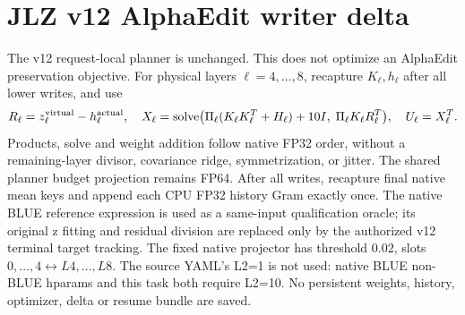 \section*{JLZ v12 AlphaEdit writer delta}
The v12 request-local planner is unchanged. This does not optimize an AlphaEdit preservation objective.
For physical layers $\ell=4,\ldots,8$, recapture $K_\ell,h_\ell$ after all lower writes, and use
\[
R_\ell=z^{\rm virtual}_\ell-h^{\rm actual}_\ell,\quad
X_\ell=\operatorname{solve}\bigl(\Pi_\ell(K_\ell K_\ell^T+H_\ell)+10I,\;\Pi_\ell K_\ell R_\ell^T\bigr),\quad U_\ell=X_\ell^T.
\]
Products, solve and weight addition follow native FP32 order, without a remaining-layer divisor, covariance ridge, symmetrization, or jitter. The shared planner budget projection remains FP64.
After all writes, recapture final native mean keys and append each CPU FP32 history Gram exactly once.
The native BLUE reference expression is used as a same-input qualification oracle; its original z fitting and residual division are replaced only by the authorized v12 terminal target tracking.
The fixed native projector has threshold $0.02$, slots $0,\ldots,4\leftrightarrow L4,\ldots,L8$. The source YAML's L2=1 is not used: native BLUE non-BLUE hparams and this task both require L2=10.
No persistent weights, history, optimizer, delta or resume bundle are saved.
